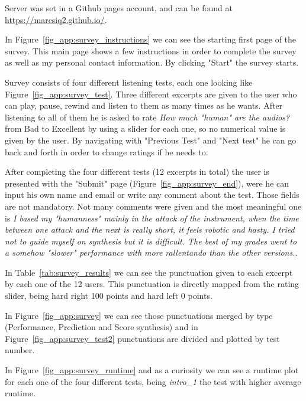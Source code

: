 \begin{appendices}
Server was set in a Github pages account, and can be found at \url{https://marcsiq2.github.io/}.

In Figure~\ref{fig_app:survey_instructions} we can see the starting first page of the survey. This main page shows a few instructions in order to complete the survey as well as my personal contact information. By clicking "Start" the survey starts.

Survey consists of four different listening tests, each one looking like Figure~\ref{fig_app:survey_test}. Three different excerpts are given to the user who can play, pause, rewind and listen to them as many times as he wants. After listening to all of them he is asked to rate \textit{How much "human" are the audios?} from Bad to Excellent by using a slider for each one, so no numerical value is given by the user. By navigating with "Previous Test" and "Next test" he can go back and forth in order to change ratings if he needs to.

After completing the four different tests (12 excerpts in total) the user is presented with the "Submit" page (Figure~\ref{fig_app:survey_end}), were he can input his own name and email or write any comment about the test. Those fields are not mandatory. Not many comments were given and the most meaningful one is \textit{I based my "humanness" mainly in the attack of the instrument, when the time between one attack and the next is really short, it feels robotic and hasty. I tried not to guide myself on synthesis but it is difficult. The best of my grades went to a somehow "slower" performance with more rallentando than the other versions.}.

In Table~\ref{tab:survey_results} we can see the punctuation given to each excerpt by each one of the 12 users. This punctuation is directly mapped from the rating slider, being hard right 100 points and hard left 0 points. 

In Figure~\ref{fig_app:survey} we can see those punctuations merged by type (Performance, Prediction and Score synthesis) and in Figure~\ref{fig_app:survey_test2} punctuations are divided and plotted by test number.

In Figure~\ref{fig_app:survey_runtime} and as a curiosity we can see a runtime plot for each one of the four different tests, being \textit{intro\_1} the test with higher average runtime.


\end{appendices}
